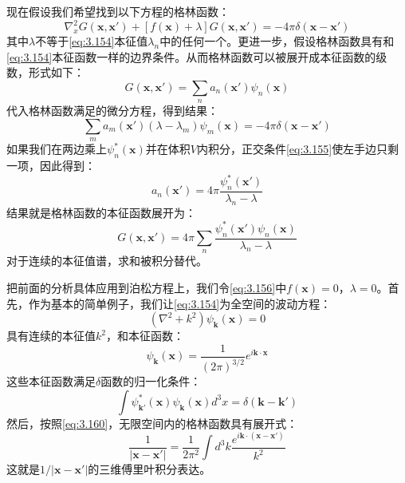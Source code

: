 \documentclass[12pt]{book}
\numberwithin{equation}{chapter}
\numberwithin{figure}{chapter}
\numberwithin{footnote}{page}
\begin{document}
现在假设我们希望找到以下方程的格林函数：
\begin{equation}\label{eq:3.156}
    \nabla^2_x G(\mathbf{x},\mathbf{x'})+[f(\mathbf{x})+\lambda]G(\mathbf{x},\mathbf{x'})=-4\pi\delta(\mathbf{x}-\mathbf{x'})
\end{equation}
其中$\lambda$不等于\autoref{eq:3.154}本征值$\lambda_n$中的任何一个。更进一步，假设格林函数具有和\autoref{eq:3.154}本征函数一样的边界条件。从而格林函数可以被展开成本征函数的级数，形式如下：
\begin{equation}\label{eq:3.157}
    G(\mathbf{x},\mathbf{x'})=\sum_n a_n(\mathbf{x'})\psi_n(\mathbf{x})
\end{equation}
代入格林函数满足的微分方程，得到结果：
\begin{equation}\label{eq:3.158}
    \sum_m a_m(\mathbf{x'})(\lambda-\lambda_m)\psi_m(\mathbf{x})=-4\pi\delta(\mathbf{x}-\mathbf{x'})
\end{equation}
如果我们在两边乘上$\psi_n^*(\mathbf{x})$并在体积$V$内积分，正交条件\autoref{eq:3.155}使左手边只剩一项，因此得到：
\begin{equation}\label{eq:3.159}
    a_n(\mathbf{x'})=4\pi\frac{\psi_n^*(\mathbf{x'})}{\lambda_n-\lambda}
\end{equation}
结果就是格林函数的本征函数展开为：
\begin{equation}\label{eq:3.160}
    G(\mathbf{x},\mathbf{x'})=4\pi \sum_n \frac{\psi_n^*(\mathbf{x'})\psi_n(\mathbf{x})}{\lambda_n-\lambda}
\end{equation}
对于连续的本征值谱，求和被积分替代。

把前面的分析具体应用到泊松方程上，我们令\autoref{eq:3.156}中$f(\mathbf{x})=0$，$\lambda=0$。首先，作为基本的简单例子，我们让\autoref{eq:3.154}为全空间的波动方程：
\begin{equation}\label{eq:3.161}
    (\nabla^2+k^2)\psi_{\mathbf{k}}(\mathbf{x})=0
\end{equation}
具有连续的本征值$k^2$，和本征函数：
\begin{equation}\label{eq:3.162}
    \psi_{\mathbf{k}}(\mathbf{x})=\frac{1}{(2\pi)^{3/2}}e^{i\mathbf{k}\cdot\mathbf{x}}
\end{equation}
这些本征函数满足$\delta$函数的归一化条件：
\begin{equation}\label{eq:3.163}
    \int \psi_{\mathbf{k'}}^*(\mathbf{x})\psi_{\mathbf{k}}(\mathbf{x}) d^3x=\delta(\mathbf{k}-\mathbf{k'})
\end{equation}
然后，按照\autoref{eq:3.160}，无限空间内的格林函数具有展开式：
\begin{equation}\label{eq:3.164}
    \frac{1}{|\mathbf{x}-\mathbf{x'}|}=\frac{1}{2\pi^2}\int d^3k \frac{e^{i\mathbf{k}\cdot(\mathbf{x}-\mathbf{x'})}}{k^2} 
\end{equation}
这就是$1/|\mathbf{x}-\mathbf{x'}|$的三维傅里叶积分表达。
\end{document}
